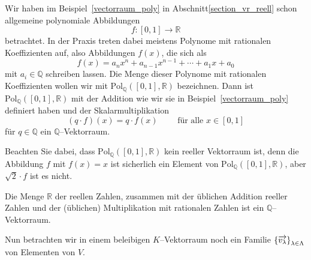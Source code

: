 \begin{beispiel} Wir haben im Beispiel~\ref{vectorraum_poly} in Abschnitt\ref{section_vr_reell} 
schon allgemeine polynomiale Abbildungen 
  	$$ f : [0, 1] \longrightarrow \mathbb R $$
betrachtet. In der Praxis treten dabei meistens Polynome mit rationalen Koeffizienten 
auf, also Abbildungen $f(x)$, die sich als 
  	$$ f(x) = a_n x^n + a_{n-1} x^{n-1} + \cdots + a_1 x + a_0 $$
mit $a_i \in \mathbb Q$ schreiben lassen. Die Menge dieser Polynome mit rationalen 
Koeffizienten wollen wir mit $\textrm{Pol}_{\mathbb Q}([0,1], \mathbb R)$ bezeichnen. 
Dann ist $\textrm{Pol}_{\mathbb Q}([0,1], \mathbb R)$ mit der Addition wie wir sie in 
Beispiel~\ref{vectorraum_poly} definiert haben und der Skalarmultiplikation
  	$$ (q \cdot f)(x) = q \cdot f(x) \qquad \textrm{ für alle } x \in [0,1] $$
für $q \in \mathbb Q$ ein $\mathbb Q$--Vektorraum. 

Beachten Sie dabei, dass $\textrm{Pol}_{\mathbb Q}([0,1], \mathbb R)$ kein reeller 
Vektorraum ist, denn die Abbildung $f$ mit  $f(x) = x$ ist sicherlich ein Element von 
$\textrm{Pol}_{\mathbb Q}([0,1], \mathbb R)$, aber $\sqrt{2} \cdot f$ ist es nicht.
\end{beispiel}

\begin{beispiel} Die Menge $\mathbb R$ der reellen Zahlen, zusammen mit der üblichen 
Addition reeller Zahlen und der (üblichen) Multiplikation mit rationalen Zahlen ist 
ein $\mathbb Q$--Vektorraum.
\end{beispiel}


Nun betrachten wir in einem beleibigen $K$--Vektorraum noch ein Familie $\left\{ 
\overrightarrow{v_{\lambda}} \right\}_{\lambda \in \Lambda}$ von 
Elementen von $V$.

